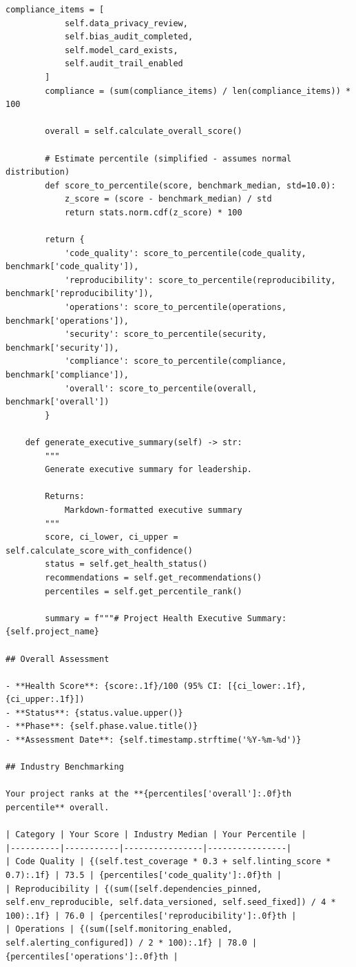 \begin{lstlisting}[style=python, caption={Comprehensive project health metrics framework with 15+ dimensions}]
        compliance_items = [
            self.data_privacy_review,
            self.bias_audit_completed,
            self.model_card_exists,
            self.audit_trail_enabled
        ]
        compliance = (sum(compliance_items) / len(compliance_items)) * 100

        overall = self.calculate_overall_score()

        # Estimate percentile (simplified - assumes normal distribution)
        def score_to_percentile(score, benchmark_median, std=10.0):
            z_score = (score - benchmark_median) / std
            return stats.norm.cdf(z_score) * 100

        return {
            'code_quality': score_to_percentile(code_quality, benchmark['code_quality']),
            'reproducibility': score_to_percentile(reproducibility, benchmark['reproducibility']),
            'operations': score_to_percentile(operations, benchmark['operations']),
            'security': score_to_percentile(security, benchmark['security']),
            'compliance': score_to_percentile(compliance, benchmark['compliance']),
            'overall': score_to_percentile(overall, benchmark['overall'])
        }

    def generate_executive_summary(self) -> str:
        """
        Generate executive summary for leadership.

        Returns:
            Markdown-formatted executive summary
        """
        score, ci_lower, ci_upper = self.calculate_score_with_confidence()
        status = self.get_health_status()
        recommendations = self.get_recommendations()
        percentiles = self.get_percentile_rank()

        summary = f"""# Project Health Executive Summary: {self.project_name}

## Overall Assessment

- **Health Score**: {score:.1f}/100 (95% CI: [{ci_lower:.1f}, {ci_upper:.1f}])
- **Status**: {status.value.upper()}
- **Phase**: {self.phase.value.title()}
- **Assessment Date**: {self.timestamp.strftime('%Y-%m-%d')}

## Industry Benchmarking

Your project ranks at the **{percentiles['overall']:.0f}th percentile** overall.

| Category | Your Score | Industry Median | Your Percentile |
|----------|-----------|----------------|----------------|
| Code Quality | {(self.test_coverage * 0.3 + self.linting_score * 0.7):.1f} | 73.5 | {percentiles['code_quality']:.0f}th |
| Reproducibility | {(sum([self.dependencies_pinned, self.env_reproducible, self.data_versioned, self.seed_fixed]) / 4 * 100):.1f} | 76.0 | {percentiles['reproducibility']:.0f}th |
| Operations | {(sum([self.monitoring_enabled, self.alerting_configured]) / 2 * 100):.1f} | 78.0 | {percentiles['operations']:.0f}th |


\end{lstlisting}
